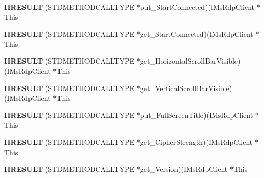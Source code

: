 \begin{DoxyCompactItemize}
\item 
\mbox{\label{struct_i_ms_rdp_client_vtbl_afd15aec2661d309a16369f213a5af669}} 
{\bfseries H\+R\+E\+S\+U\+LT} (S\+T\+D\+M\+E\+T\+H\+O\+D\+C\+A\+L\+L\+T\+Y\+PE $\ast$put\+\_\+\+Start\+Connected)(I\+Ms\+Rdp\+Client $\ast$This
\item 
\mbox{\label{struct_i_ms_rdp_client_vtbl_a486330cab19b42fe3e747792b5253b86}} 
{\bfseries H\+R\+E\+S\+U\+LT} (S\+T\+D\+M\+E\+T\+H\+O\+D\+C\+A\+L\+L\+T\+Y\+PE $\ast$get\+\_\+\+Start\+Connected)(I\+Ms\+Rdp\+Client $\ast$This
\item 
\mbox{\label{struct_i_ms_rdp_client_vtbl_a81e66e7a89f07adcc9190023f5061c52}} 
{\bfseries H\+R\+E\+S\+U\+LT} (S\+T\+D\+M\+E\+T\+H\+O\+D\+C\+A\+L\+L\+T\+Y\+PE $\ast$get\+\_\+\+Horizontal\+Scroll\+Bar\+Visible)(I\+Ms\+Rdp\+Client $\ast$This
\item 
\mbox{\label{struct_i_ms_rdp_client_vtbl_a3c8d7f77ca3b4ce7312e841eec5653fa}} 
{\bfseries H\+R\+E\+S\+U\+LT} (S\+T\+D\+M\+E\+T\+H\+O\+D\+C\+A\+L\+L\+T\+Y\+PE $\ast$get\+\_\+\+Vertical\+Scroll\+Bar\+Visible)(I\+Ms\+Rdp\+Client $\ast$This
\item 
\mbox{\label{struct_i_ms_rdp_client_vtbl_aed7ba22ca825e0be2f00a232199041f3}} 
{\bfseries H\+R\+E\+S\+U\+LT} (S\+T\+D\+M\+E\+T\+H\+O\+D\+C\+A\+L\+L\+T\+Y\+PE $\ast$put\+\_\+\+Full\+Screen\+Title)(I\+Ms\+Rdp\+Client $\ast$This
\item 
\mbox{\label{struct_i_ms_rdp_client_vtbl_a91081c6742da83b832a7d9dcda7cd2f7}} 
{\bfseries H\+R\+E\+S\+U\+LT} (S\+T\+D\+M\+E\+T\+H\+O\+D\+C\+A\+L\+L\+T\+Y\+PE $\ast$get\+\_\+\+Cipher\+Strength)(I\+Ms\+Rdp\+Client $\ast$This
\item 
\mbox{\label{struct_i_ms_rdp_client_vtbl_a6dae7e01457047511d3fbd0c97b22643}} 
{\bfseries H\+R\+E\+S\+U\+LT} (S\+T\+D\+M\+E\+T\+H\+O\+D\+C\+A\+L\+L\+T\+Y\+PE $\ast$get\+\_\+\+Version)(I\+Ms\+Rdp\+Client $\ast$This
\item 
\mbox{\label{struct_i_ms_rdp_client_vtbl_a6b52e4ec32701ad430035b23df281aaf}} 

\end{DoxyCompactItemize}
